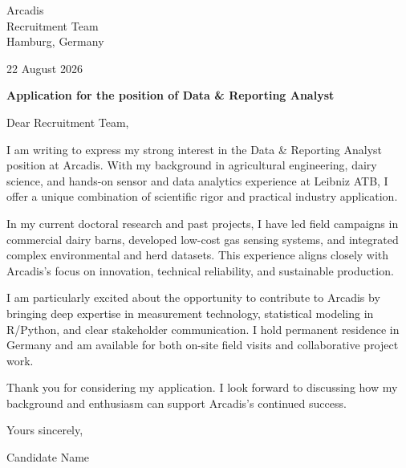 \documentclass[10pt,a4paper]{article}
\begin{document}

Arcadis\\

Recruitment Team\\

Hamburg, Germany

\vspace{10pt}
22 August 2026

\vspace{10pt}
\textbf{Application for the position of Data \& Reporting Analyst}


\vspace{8pt}
Dear Recruitment Team,


I am writing to express my strong interest in the Data \& Reporting Analyst position at Arcadis. With my background in agricultural engineering, dairy science, and hands-on sensor and data analytics experience at Leibniz ATB, I offer a unique combination of scientific rigor and practical industry application.

\vspace{4pt}

In my current doctoral research and past projects, I have led field campaigns in commercial dairy barns, developed low-cost gas sensing systems, and integrated complex environmental and herd datasets. This experience aligns closely with Arcadis's focus on innovation, technical reliability, and sustainable production.

\vspace{4pt}

I am particularly excited about the opportunity to contribute to Arcadis by bringing deep expertise in measurement technology, statistical modeling in R/Python, and clear stakeholder communication. I hold permanent residence in Germany and am available for both on-site field visits and collaborative project work.

\vspace{4pt}

Thank you for considering my application. I look forward to discussing how my background and enthusiasm can support Arcadis's continued success.

\vspace{4pt}


Yours sincerely,

\vspace{14pt}
Candidate Name
\end{document}
